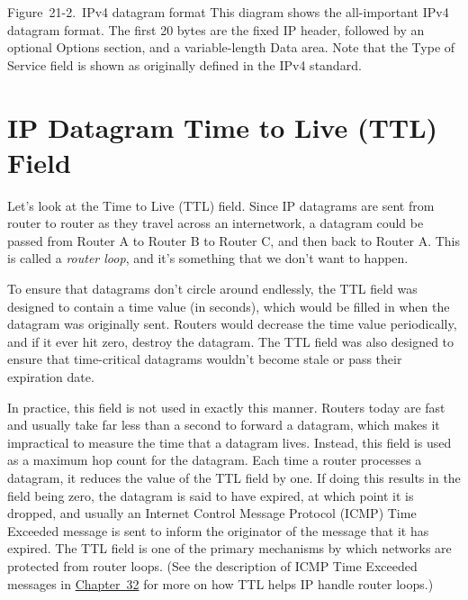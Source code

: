 \protect\hypertarget{ch21s02.htmlux5cux23ipv4_datagram_format_this_diagram_shows_}{}{}

\protect\hypertarget{ch21s02.htmlux5cux23I_mediaobject7_d1e23159}{}{}

Figure~21-2.~IPv4 datagram format This diagram shows the all-important
IPv4 datagram format. The first 20 bytes are the fixed IP header,
followed by an optional Options section, and a variable-length Data
area. Note that the Type of Service field is shown as originally defined
in the IPv4 standard.

\section{IP Datagram Time to Live (TTL) Field}

Let's look at the
\protect\hypertarget{ch21s02.htmlux5cux23idx-CHP-21-0779}{}{}Time to
Live (TTL) field. Since IP datagrams are sent from router to router as
they travel across an internetwork, a datagram could be passed from
Router A to Router B to Router C, and then back to Router A. This is
called a {\emph{router loop}}, and it's something that we don't want to
happen.

To ensure that datagrams don't circle around endlessly, the TTL
\protect\hypertarget{ch21s02.htmlux5cux23idx-CHP-21-0780}{}{}field was
designed to contain a time value (in seconds), which would be filled in
when the datagram was originally sent. Routers would decrease the time
value periodically, and if it ever hit zero, destroy the datagram. The
TTL \protect\hypertarget{ch21s02.htmlux5cux23idx-CHP-21-0781}{}{}field
was also designed to ensure that time-critical datagrams wouldn't become
stale or pass their expiration date.

In practice, this field is not used in exactly this manner. Routers
today are fast and usually take far less than a second to forward a
datagram, which makes it impractical to measure the time that a datagram
lives. Instead, this field is used as a maximum hop count for the
datagram. Each time a router processes a datagram, it reduces the value
of the TTL field by one. If doing this results in the field being zero,
the datagram is said to have expired, at which point it is dropped, and
usually an Internet Control Message Protocol (ICMP) Time Exceeded
message is sent to inform the originator of the message that it has
expired. The TTL field is one of the primary mechanisms by which
networks are protected from
\protect\hypertarget{ch21s02.htmlux5cux23idx-CHP-21-0782}{}{}router
loops. (See the description of ICMP Time Exceeded messages in
\protect\hyperlink{ch32.html}{Chapter~32} for more on how TTL helps IP
handle router
\protect\hypertarget{ch21s02.htmlux5cux23idx-CHP-21-0783}{}{}loops.)





